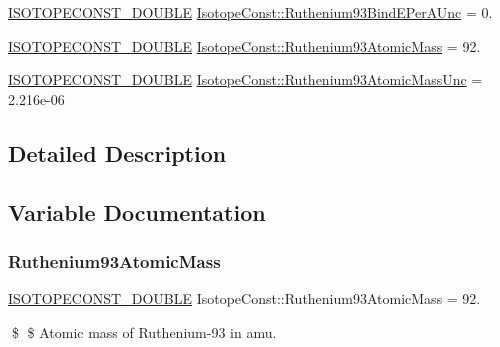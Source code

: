\begin{DoxyCompactItemize}
\mbox{\hyperlink{group___isotope_const-_macros_ga8f45a7272ce02c0b4c65c44636ed719a}{I\+S\+O\+T\+O\+P\+E\+C\+O\+N\+S\+T\+\_\+\+D\+O\+U\+B\+LE}} \mbox{\hyperlink{group___isotope_const-_ruthenium-_ru93_ga3364bd4a4c68ffc1a9b8bcb69a197f1c}{Isotope\+Const\+::\+Ruthenium93\+Bind\+E\+Per\+A\+Unc}} = 0.
\item 
\mbox{\hyperlink{group___isotope_const-_macros_ga8f45a7272ce02c0b4c65c44636ed719a}{I\+S\+O\+T\+O\+P\+E\+C\+O\+N\+S\+T\+\_\+\+D\+O\+U\+B\+LE}} \mbox{\hyperlink{group___isotope_const-_ruthenium-_ru93_ga71d38658cb874bbadca7e2f7744a7d5b}{Isotope\+Const\+::\+Ruthenium93\+Atomic\+Mass}} = 92.
\item 
\mbox{\hyperlink{group___isotope_const-_macros_ga8f45a7272ce02c0b4c65c44636ed719a}{I\+S\+O\+T\+O\+P\+E\+C\+O\+N\+S\+T\+\_\+\+D\+O\+U\+B\+LE}} \mbox{\hyperlink{group___isotope_const-_ruthenium-_ru93_gabc8239ed63feabd633f2c39a9d872f51}{Isotope\+Const\+::\+Ruthenium93\+Atomic\+Mass\+Unc}} = 2.\+216e-\/06
\end{DoxyCompactItemize}


\subsection{Detailed Description}


\subsection{Variable Documentation}
\mbox{\label{group___isotope_const-_ruthenium-_ru93_ga71d38658cb874bbadca7e2f7744a7d5b}} 
\subsubsection{\texorpdfstring{Ruthenium93\+Atomic\+Mass}{Ruthenium93AtomicMass}}
{\footnotesize\ttfamily \mbox{\hyperlink{group___isotope_const-_macros_ga8f45a7272ce02c0b4c65c44636ed719a}{I\+S\+O\+T\+O\+P\+E\+C\+O\+N\+S\+T\+\_\+\+D\+O\+U\+B\+LE}} Isotope\+Const\+::\+Ruthenium93\+Atomic\+Mass = 92.}

\$ \$ Atomic mass of Ruthenium-\/93 in amu. \mbox{\label{group___isotope_const-_ruthenium-_ru93_gabc8239ed63feabd633f2c39a9d872f51}} 
